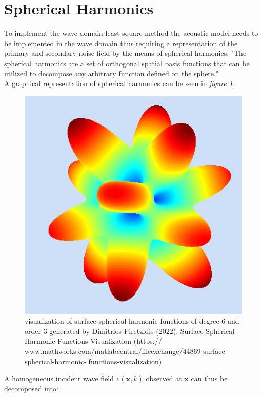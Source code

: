 \section{Spherical Harmonics}
To implement the wave-domain least square method the acoustic model needs to be implemented in the wave domain thus requiring a representation of the primary and secondary noise field by the means of spherical harmonics.
"The spherical harmonics are a set of orthogonal spatial basis functions that can be utilized
to decompose any arbitrary function defined on the sphere."\cite{Samarasinghe2018}\\ A graphical representation of spherical harmonics can be seen in \textit{figure \ref{fig:sph_harmonics}}.\\
\begin{figure}
    \centerline{\includegraphics[width=1.3\textwidth,keepaspectratio]{LaTeX/images/plots/spherical_hamonics.png}}
    \caption{visualization of surface spherical harmonic functions of degree 6 and order 3 generated by Dimitrios Piretzidis (2022). Surface Spherical Harmonic Functions Visualization (https:// www.mathworks.com/matlabcentral/fileexchange/44869-surface-spherical-harmonic- functions-visualization)}
    \label{fig:sph_harmonics}
\end{figure}
A homogeneous incident wave field $v(\mathbf{x},k)$ observed at $\mathbf{x}$ can thus be decomposed into\cite{Zhang2019}:
